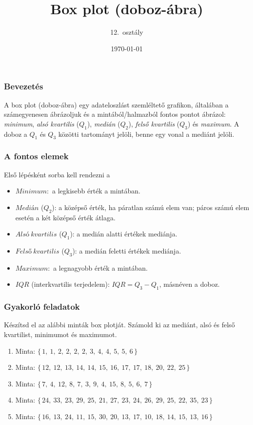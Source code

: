 \documentclass[12pt,a4paper]{article}
\title{Box plot (doboz-ábra)}
\author{12.\ osztály}
\date{\today}
\begin{document}
\maketitle

\subsubsection*{Bevezetés}
\noindent A box plot (doboz-ábra) egy adat\-eloszlást szemléltető grafikon, általában a számegyenesen ábrázoljuk és a mintából/halmazból fontos pontot ábrázol:
\emph{minimum}, \emph{alsó kvartilis} ($Q_1$), \emph{medián} ($Q_2$), \emph{felső kvartilis} ($Q_3$) és \emph{maximum}. 
A doboz a $Q_1$ és $Q_3$ közötti tartományt jelöli, benne egy vonal a mediánt jelöli. 
\\

\subsubsection*{A fontos elemek}
\noindent Első lépésként sorba kell rendezni a 
\begin{itemize}
  \item $Minimum:$ a legkisebb érték a mintában.
  \item $Medián$ ($Q_2$): a középső érték, ha páratlan számú elem van; 
  páros számú elem esetén a két középső érték átlaga.
  \item $Alsó\ kvartilis$ ($Q_1$): a medián alatti értékek mediánja.
  \item $Felső\ kvartilis$ ($Q_3$): a medián feletti értékek mediánja.
  \item $Maximum:$ a legnagyobb érték a mintában.
  \item $IQR$ (interkvartilis terjedelem): $IQR = Q_3 - Q_1$, másnéven a doboz.
\end{itemize}

\subsubsection*{Gyakorló feladatok}
\noindent Készítsd el az alábbi minták box plotját. 
Számold ki az mediánt, alsó és felső kvartilist, minimumot és maximumot.
\\
\begin{enumerate}[label=\alph*]
  \item \noindent Minta: $\{\,1,\ 1,\ 2,\ 2,\ 2,\ 2,\ 3,\ 4,\ 4,\ 5,\ 5,\ 6\,\}$
  \item \noindent Minta: $\{\,12,\ 12,\ 13,\ 14,\ 14,\ 15,\ 16,\ 17,\ 17,\ 18,\ 20,\ 22,\ 25\,\}$
  \item \noindent Minta: $\{\,7,\ 4,\ 12,\ 8,\ 7,\ 3,\ 9,\ 4,\ 15,\ 8,\ 5,\ 6,\ 7\,\}$
  \item \noindent Minta: $\{\,24,\ 33,\ 23,\ 29,\ 25,\ 21,\ 27,\ 23,\ 24,\ 26,\ 29,\ 25,\ 22,\ 35,\ 23\,\}$
  \item \noindent Minta: $\{\,16,\ 13,\ 24,\ 11,\ 15,\ 30,\ 20,\ 13,\ 17,\ 10,\ 18,\ 14,\ 15,\ 13,\ 16\,\}$
\end{enumerate}
\end{document}
